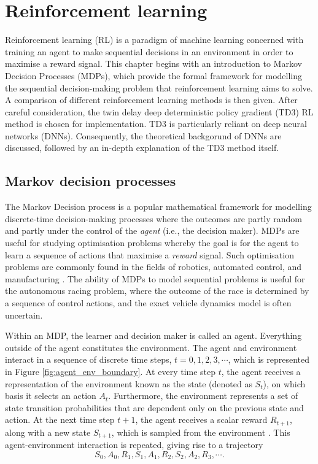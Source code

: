 \chapter{Reinforcement learning}\label{chp:rl}


Reinforcement learning (RL) is a paradigm of machine learning concerned with training an agent to make sequential decisions in an environment in order to maximise a reward signal.
This chapter begins with an introduction to Markov Decision Processes (MDPs), which provide the formal framework for modelling the sequential decision-making problem that reinforcement learning aims to solve.
A comparison of different reinforcement learning methods is then given.
After careful consideration, the twin delay deep deterministic policy gradient (TD3) RL method is chosen for implementation.
TD3 is particularly reliant on deep neural networks (DNNs). 
Consequently, the theoretical backgorund of DNNs are discussed, followed by an in-depth explanation of the TD3 method itself.


\section{Markov decision processes}\label{sec:mdps}

The Markov Decision process is a popular mathematical framework for modelling discrete-time decision-making processes where the outcomes are partly random and partly under the control of the \emph{agent} (i.e., the decision maker).
MDPs are useful for studying optimisation problems whereby the goal is for the agent to learn a sequence of actions that maximise a \emph{reward} signal.
Such optimisation problems are commonly found in the fields of robotics, automated control, and manufacturing \cite{White1985}.
The ability of MDPs to model sequential problems is useful for the autonomous racing problem, where the outcome of the race is determined by a sequence of control actions, and the exact vehicle dynamics model is often uncertain.



Within an MDP, the learner and decision maker is called an agent.
Everything outside of the agent constitutes the environment.
The agent and environment interact in a sequence of discrete time steps, $t=0,1,2,3, \cdots$, which is represented in Figure \ref{fig:agent_env_boundary}.
At every time step $t$, the agent receives a  representation of the environment known as the state (denoted as $S_t$), on which basis it selects an action $A_t$.
Furthermore, the environment represents a set of state transition probabilities that are dependent only on the previous state and action.
At the next time step $t+1$, the agent receives a scalar reward $R_{t+1}$, along with a new state $S_{t+1}$, which is sampled from the environment \cite{sutton2020}.
This agent-environment interaction is repeated, giving rise to a trajectory
\begin{equation}\label{eq:mdp_trajectory}
S_0, A_0, R_1, S_1, A_1, R_2, S_2, A_2, R_3, \cdots.
\end{equation}


